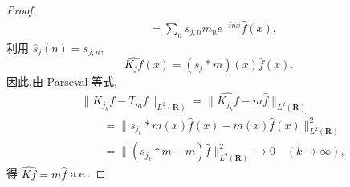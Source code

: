 \begin{proof}
\begin{align*}
&= \sum_{n}s_{j, n}m_{n}e^{-inx}\widehat{f}(x),
\end{align*}
利用 $\widehat{s}_{j}(n) = s_{j, n}$,
\begin{equation*}
\widehat{K_{j}f}(x) = (s_{j} * m)(x)\widehat{f}(x).
\end{equation*}
因此,由 Parseval 等式,
\begin{align*}
&\|K_{j_{k}}f - T_{m}f\|_{L^{2}(\mathbf{R})} = \|\widehat{K_{j_{k}}f} - m\widehat{f}\|_{L^{2}(\mathbf{R})}\\
&\qquad = \|s_{j_{k}} * m(x)\widehat{f}(x) - m(x)\widehat{f}(x)\|_{L^{2}(\mathbf{R})}^{2}\\
&\qquad = \|(s_{j_{k}} * m - m)\widehat{f}\|_{L^{2}(\mathbf{R})}^{2} \to 0 \quad (k \to \infty),
\end{align*}
得 $\widehat{Kf} = m\widehat{f}$ a.e..


\end{proof}

